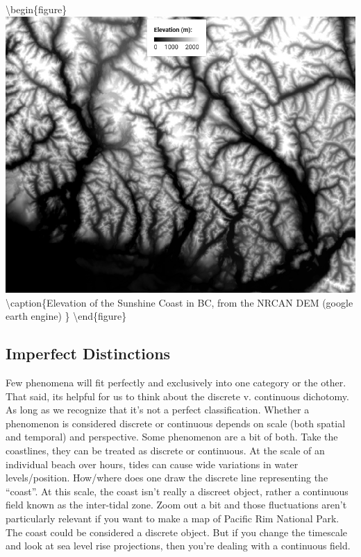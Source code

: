 \documentclass[
]{book}
\begin{document}
\textbackslash begin\{figure\}
\includegraphics[width=0.75\linewidth]{images/03-elevation} \textbackslash caption\{Elevation of the Sunshine Coast in BC, from the NRCAN DEM (google earth engine) \citep{nrcan_canadian_2021}\}\label{fig:3-elevation}
\textbackslash end\{figure\}

\hypertarget{imperfect-distinctions}{%
\subsection{Imperfect Distinctions}\label{imperfect-distinctions}}

Few phenomena will fit perfectly and exclusively into one category or the other. That said, its helpful for us to think about the discrete v. continuous dichotomy. As long as we recognize that it's not a perfect classification. Whether a phenomenon is considered discrete or continuous depends on scale (both spatial and temporal) and perspective. Some phenomenon are a bit of both. Take the coastlines, they can be treated as discrete or continuous. At the scale of an individual beach over hours, tides can cause wide variations in water levels/position. How/where does one draw the discrete line representing the ``coast''. At this scale, the coast isn't really a discreet object, rather a continuous field known as the inter-tidal zone. Zoom out a bit and those fluctuations aren't particularly relevant if you want to make a map of Pacific Rim National Park. The coast could be considered a discrete object. But if you change the timescale and look at sea level rise projections, then you're dealing with a continuous field.
\end{document}
